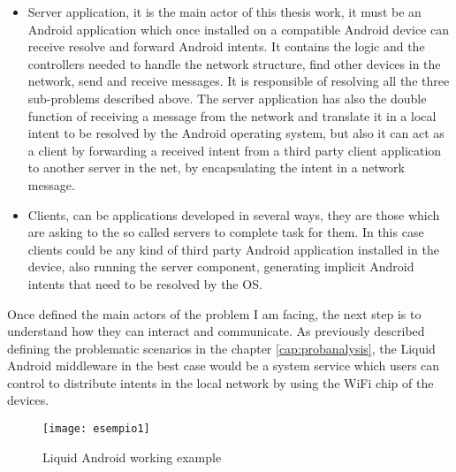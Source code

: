 \begin{itemize}
	\item Server application, it is the main actor of this thesis work, it must be an Android application which once installed on a compatible Android device can receive resolve and forward Android intents. It contains the logic and the controllers needed to handle the network structure, find other devices in the network, send and receive messages. It is responsible of resolving all the three sub-problems described above. The server application has also the double function of receiving a message from the network and translate it in a local intent to be resolved by the Android operating system, but also it can act as a client by forwarding a received intent from a third party client application to another server in the net, by encapsulating the intent in a network message.
	\item Clients, can be applications developed in several ways, they are those which are asking to the so called servers to complete task for them. In this case clients could be any kind of third party Android application installed in the device, also running the server component, generating implicit Android intents that need to be resolved by the OS. 
\end{itemize}
Once defined the main actors of the problem I am facing, the next step is to understand how they can interact and communicate. As previously described defining the problematic scenarios in the chapter \ref{cap:probanalysis}, the Liquid Android middleware in the best case would be a system service which users can control to distribute intents in the local network by using the WiFi chip of the devices.
 \begin{figure}[h]
	\centering
	\texttt{[image: esempio1]}
	\caption{Liquid Android working example}
	\label{fig:4.2}
\end{figure}
